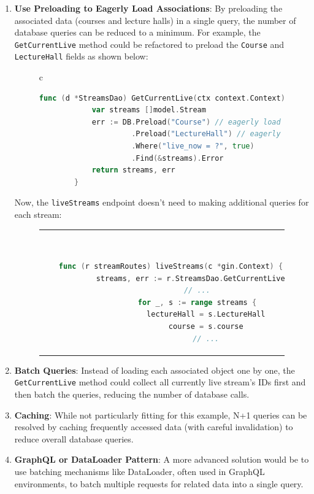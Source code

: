 \begin{enumerate}
    \item \textbf{Use Preloading to Eagerly Load Associations}: By preloading the associated data (courses and lecture halls) in a single query, the number of database queries can be reduced to a minimum. For example, the \texttt{GetCurrentLive} method could be refactored to preload the \texttt{Course} and \texttt{LectureHall} fields as shown below:

    \begin{figure}[htpb]
      \begin{tabular}{c}
      \ \small \begin{lstlisting}[language=Go]
        func (d *StreamsDao) GetCurrentLive(ctx context.Context) ([]model.Stream, error) {
            var streams []model.Stream
            err := DB.Preload("Course") // eagerly load stream's course
                     .Preload("LectureHall") // eagerly load stream's lecturehalls
                     .Where("live_now = ?", true)
                     .Find(&streams).Error
            return streams, err
        }
      \end{lstlisting}
      \end{tabular}
    \end{figure}

        Now, the \texttt{liveStreams} endpoint doesn't need to making additional queries for each stream:
    
    \begin{figure}[htpb]
      \begin{tabular}{c}
      \ \small \begin{lstlisting}[language=Go]
        func (r streamRoutes) liveStreams(c *gin.Context) {
            streams, err := r.StreamsDao.GetCurrentLive(c)
            // ...
            for _, s := range streams {
                lectureHall = s.LectureHall
                course = s.course
                // ...
      \end{lstlisting}
      \end{tabular}
    \end{figure}

    \item \textbf{Batch Queries}: Instead of loading each associated object one by one, the \texttt{GetCurrentLive} method could collect all currently live stream's IDs first and then batch the queries, reducing the number of database calls.

    \item \textbf{Caching}: While not particularly fitting for this example, N+1 queries can be resolved by caching frequently accessed data (with careful invalidation) to reduce overall database queries.

    \item \textbf{GraphQL or DataLoader Pattern}: A more advanced solution would be to use batching mechanisms like DataLoader, often used in GraphQL environments, to batch multiple requests for related data into a single query.
\end{enumerate}


